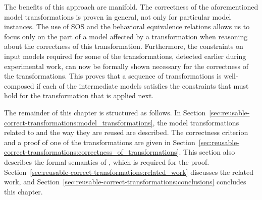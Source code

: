 The benefits of this approach are manifold.
The correctness of the aforementioned model transformations is proven in general, not only for particular model instances.
The use of SOS and the behavioral equivalence relations allows us to focus only on the part of a model affected by a transformation when reasoning about the correctness of this transformation.
Furthermore, the constraints on input models required for some of the transformations, detected earlier during experimental work, can now be formally shown necessary for the correctness of the transformations.
This proves that a sequence of transformations is well-composed if each of the intermediate models satisfies the constraints that must hold for the transformation that is applied next.

The remainder of this chapter is structured as follows.
In Section~\ref{sec:reusable-correct-transformations:model_transformations}, the model transformations related to \SLCO and the way they are reused are described.
The correctness criterion and a proof of one of the transformations are given in Section~\ref{sec:reusable-correct-transformations:correctness_of_transformations}.
This section also describes the formal semantics of \SLCO, which is required for the proof.
Section~\ref{sec:reusable-correct-transformations:related_work} discusses the related work,
and Section~\ref{sec:reusable-correct-transformations:conclusions} concludes this chapter.
